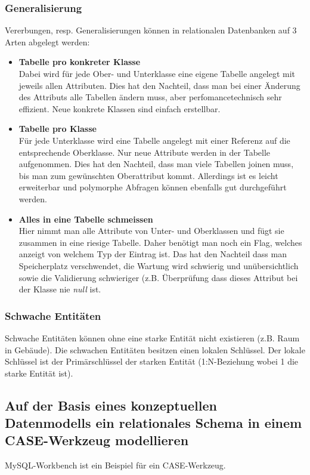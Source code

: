 \subsubsection{Generalisierung}
\label{sec:generalisierung}
Vererbungen, resp. Generalisierungen können in relationalen Datenbanken auf 3 Arten abgelegt werden:
\begin{itemize}
  \item \textbf{Tabelle pro konkreter Klasse} \\
  Dabei wird für jede Ober- und Unterklasse eine eigene Tabelle angelegt mit jeweils allen Attributen. Dies hat den Nachteil, dass man bei einer Änderung des Attributs alle Tabellen ändern muss, aber perfomancetechnisch sehr effizient. Neue konkrete Klassen sind einfach erstellbar.
  \item \textbf{Tabelle pro Klasse} \\
  Für jede Unterklasse wird eine Tabelle angelegt mit einer Referenz auf die entsprechende Oberklasse. Nur neue Attribute werden in der Tabelle aufgenommen. Dies hat den Nachteil, dass man viele Tabellen joinen muss, bis man zum gewünschten Oberattribut kommt. Allerdings ist es leicht erweiterbar und polymorphe Abfragen können ebenfalls gut durchgeführt werden.
  \item \textbf{Alles in eine Tabelle schmeissen} \\
  Hier nimmt man alle Attribute von Unter- und Oberklassen und fügt sie zusammen in eine riesige Tabelle. Daher benötigt man noch ein Flag, welches anzeigt von welchem Typ der Eintrag ist. Das hat den Nachteil dass man Speicherplatz verschwendet, die Wartung wird schwierig und unübersichtlich sowie die Validierung schwieriger (z.B. Überprüfung dass dieses Attribut bei der Klasse nie \emph{null} ist.
\end{itemize}


\subsubsection{Schwache Entitäten}

Schwache Entitäten können ohne eine starke Entität nicht existieren (z.B. Raum in Gebäude). Die schwachen Entitäten besitzen einen lokalen Schlüssel. Der lokale Schlüssel ist der Primärschlüssel der starken Entität (1:N-Beziehung wobei 1 die starke Entität ist). 

\subsection{Auf der Basis eines konzeptuellen Datenmodells ein relationales Schema in einem CASE-Werkzeug modellieren}

MySQL-Workbench ist ein Beispiel für ein \ac{CASE}-Werkzeug.